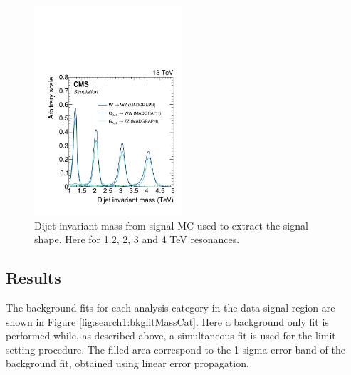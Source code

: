 \begin{figure}[h!]
\centering
\includegraphics[width=0.49\textwidth]{figures/analysis/search1/B2G-16-004/Figure_005-a.pdf}
\caption{Dijet invariant mass from signal MC used to extract the signal shape. Here for 1.2, 2, 3 and 4 TeV resonances.}
\label{fig:searchI:fit-dataVV}
\end{figure}

\clearpage

\subsection{Results}
\label{sec:searchI:results}
The background fits for each analysis category in the data signal region are shown in Figure \ref{fig:search1:bkgfitMassCat}. Here a background only fit is performed while, as described above, a simultaneous fit is used for the limit setting procedure. The filled area correspond to the 1 sigma error band of the background fit, obtained using linear error propagation.


